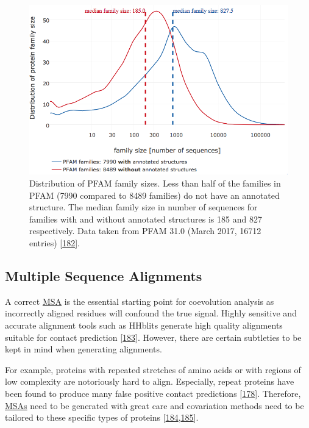 \documentclass[11pt,a4paper,twoside]{book}
\theoremstyle{definition}
\theoremstyle{definition}
\theoremstyle{remark}
\begin{document}
\begin{figure}

{\centering \includegraphics[width=0.9\linewidth]{img/pfam_pdb_notitle} 

}

\caption{Distribution of PFAM family sizes. Less than half of
the families in PFAM (7990 compared to 8489 families) do not have an
annotated structure. The median family size in number of sequences for
families with and without annotated structures is 185 and 827
respectively. Data taken from PFAM 31.0 (March 2017, 16712 entries)
{[}\protect\hyperlink{ref-Finn2016}{182}{]}.}\label{fig:pfam}
\end{figure}

\subsection{Multiple Sequence
Alignments}\label{multiple-sequence-alignments}

A correct \protect\hyperlink{abbrev}{MSA} is the essential starting
point for coevolution analysis as incorrectly aligned residues will
confound the true signal. Highly sensitive and accurate alignment tools
such as HHblits generate high quality alignments suitable for contact
prediction {[}\protect\hyperlink{ref-Remmert2012}{183}{]}. However,
there are certain subtleties to be kept in mind when generating
alignments.

For example, proteins with repeated stretches of amino acids or with
regions of low complexity are notoriously hard to align. Especially,
repeat proteins have been found to produce many false positive contact
predictions {[}\protect\hyperlink{ref-Anishchenko2017}{178}{]}.
Therefore, \protect\hyperlink{abbrev}{MSAs} need to be generated with
great care and covariation methods need to be tailored to these specific
types of proteins
{[}\protect\hyperlink{ref-Espada2014}{184},\protect\hyperlink{ref-Toth-Petroczy2016}{185}{]}.
\end{document}
